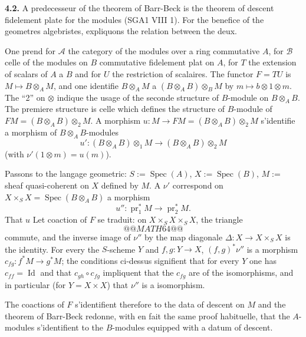 \documentclass[12pt,a4paper]{article}
\theoremstyle{plain}
\theoremstyle{definition}
\theoremstyle{remark}
\DeclareMathOperator{\Spec}{Spec}
\DeclareMathOperator{\Id}{Id}
\DeclareMathOperator{\pr}{pr}
\begin{document}
\textbf{4.2.} A predecesseur of the theorem of Barr-Beck is the theorem of descent fidelement plate for the modules (SGA1 VIII 1). For the benefice of the geometres algebristes, expliquons the relation between the deux.

One prend for $\mathcal{A}$ the category of the modules over a ring commutative $A$, for $\mathcal{B}$ celle of the modules on $B$ commutative fidelement plat on $A$, for $T$ the extension of scalars of $A$ a $B$ and for $U$ the restriction of scalaires. The functor $F = TU$ is $M \mapsto B \otimes_A M$, and one identifie $B \otimes_A M$ a $(B \otimes_A B) \otimes_B M$ by $m \mapsto b \otimes 1 \otimes m$. The ``2'' on $\otimes$ indique the usage of the seconde structure of $B$-module on $B \otimes_A B$. The premiere structure is celle which defines the structure of $B$-module of $FM = (B \otimes_A B) \otimes_2 M$. A morphism $u : M \to FM = (B \otimes_A B) \otimes_2 M$ s'identifie a morphism of $B \otimes_A B$-modules
\[
u' : (B \otimes_A B) \otimes_1 M \to (B \otimes_A B) \otimes_2 M
\]
(with $\nu'(1 \otimes m) = u(m)$).

Passons to the langage geometric: $S := \Spec(A)$, $X := \Spec(B)$, $M :=$ sheaf quasi-coherent on $X$ defined by $M$. A $\nu'$ correspond on $X \times_S X = \Spec(B \otimes_A B)$ a morphism
\[
u'' : \pr_1^* M \to \pr_2^* M.
\]
That $u$ Let coaction of $F$ se traduit: on $X \times_S X \times_S X$, the triangle
\[
@@MATH64@@
\]
commute, and the inverse image of $\nu''$ by the map diagonale $\Delta : X \to X \times_S X$ is the identity. For every the $S$-scheme $Y$ and $f,g : Y \to X$, $(f,g)^*\nu''$ is a morphism $c_{fg} : f^*M \to g^*M$; the conditions ci-dessus signifient that for every $Y$ one has $c_{ff} = \Id$ and that $c_{gh} \circ c_{fg}$ impliquent that the $c_{fg}$ are of the isomorphisms, and in particular (for $Y = X \times X$) that $\nu''$ is a isomorphism.

The coactions of $F$ s'identifient therefore to the data of descent on $M$ and the theorem of Barr-Beck redonne, with en fait the same proof habituelle, that the $A$-modules s'identifient to the $B$-modules equipped with a datum of descent.

\subsection{}
\end{document}
